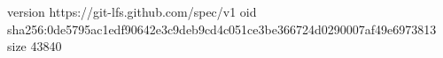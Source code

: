 version https://git-lfs.github.com/spec/v1
oid sha256:0de5795ac1edf90642e3c9deb9cd4c051ce3be366724d0290007af49e6973813
size 43840

